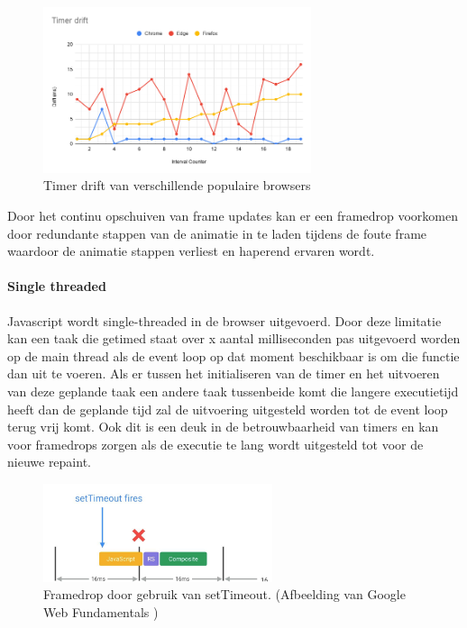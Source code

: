 \begin{figure} [H]
	\centering
	\includegraphics [width=0.7\textwidth] {img/Timer drift.png}
	\caption{Timer drift van verschillende populaire browsers} \label{drift}
\end{figure}

Door het continu opschuiven van frame updates kan er een framedrop voorkomen door redundante stappen van de animatie in te laden tijdens de foute frame waardoor de animatie stappen verliest en haperend ervaren wordt.

\paragraph{Single threaded}
Javascript wordt single-threaded in de browser uitgevoerd. Door deze limitatie kan een taak die getimed staat over x aantal milliseconden pas uitgevoerd worden op de main thread als de event loop op dat moment beschikbaar is om die functie dan uit te voeren. Als er tussen het initialiseren van de timer en het uitvoeren van deze geplande taak een andere taak tussenbeide komt die langere executietijd heeft dan de geplande tijd zal de uitvoering uitgesteld worden tot de event loop terug vrij komt. Ook dit is een deuk in de betrouwbaarheid van timers en kan voor framedrops zorgen als de executie te lang wordt uitgesteld tot voor de nieuwe repaint.

\begin{figure} [H]
	\centering
	\includegraphics [width=0.6\textwidth] {img/drift-framedrop.png}
	\caption{Framedrop door gebruik van setTimeout. (Afbeelding van Google Web Fundamentals \cite{frameDrop:img})} \label{drift-framedrop}
\end{figure}

